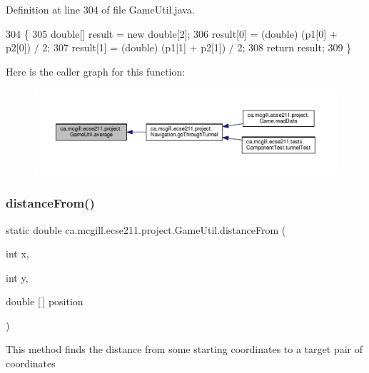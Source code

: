 Definition at line 304 of file Game\+Util.\+java.


\begin{DoxyCode}
304                                                      \{
305     \textcolor{keywordtype}{double}[] result = \textcolor{keyword}{new} \textcolor{keywordtype}{double}[2];
306     result[0] = (double) (p1[0] + p2[0]) / 2;
307     result[1] = (double) (p1[1] + p2[1]) / 2;
308     \textcolor{keywordflow}{return} result;
309   \}
\end{DoxyCode}
Here is the caller graph for this function\+:\nopagebreak
\begin{figure}[H]
\begin{center}
\leavevmode
\includegraphics[width=350pt]{classca_1_1mcgill_1_1ecse211_1_1project_1_1_game_util_ae5c5c445ab84516991219ca3783fcaa4_icgraph}
\end{center}
\end{figure}
\mbox{\label{classca_1_1mcgill_1_1ecse211_1_1project_1_1_game_util_a6fb324a3d5e42414c83dfd8bd5910b56}} 
\subsubsection{\texorpdfstring{distance\+From()}{distanceFrom()}}
{\footnotesize\ttfamily static double ca.\+mcgill.\+ecse211.\+project.\+Game\+Util.\+distance\+From (\begin{DoxyParamCaption}\item[{int}]{x,  }\item[{int}]{y,  }\item[{double \mbox{[}$\,$\mbox{]}}]{position }\end{DoxyParamCaption})\hspace{0.3cm}{\ttfamily [static]}}

This method finds the distance from some starting coordinates to a target pair of coordinates


